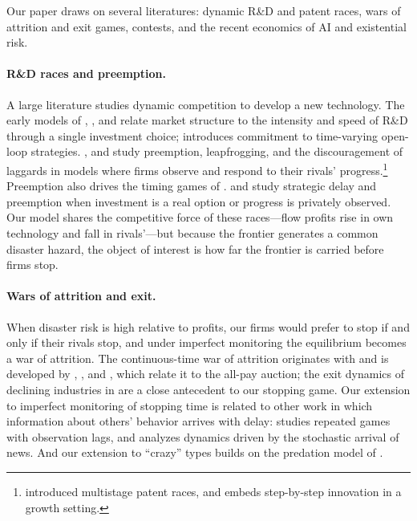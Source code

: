 \documentclass[12pt,reqno]{article}
\theoremstyle{definition} \newtheorem{example}{Example}
\theoremstyle{definition} \newtheorem{condition}{Condition}
\theoremstyle{definition} \newtheorem{corollary}{Corollary}
\theoremstyle{definition} \newtheorem{claim}{Claim}
\theoremstyle{definition} \newtheorem{definition}{Definition}
\theoremstyle{definition} \newtheorem{conjecture}{Conjecture}
\theoremstyle{definition} \newtheorem{Lemma}{Lemma}
\theoremstyle{definition} \newtheorem{lemma}{Lemma}
\theoremstyle{plain} \newtheorem{theorem}{Theorem}
\theoremstyle{definition} \newtheorem{assumption}{Assumption}
\theoremstyle{definition} \newtheorem*{assumptionnonumber}{Assumption}
\theoremstyle{definition} \newtheorem*{theoremNoNumber}{Proposition}
\theoremstyle{definition}
\theoremstyle{definition}\newtheorem{proposition}{Proposition}
\theoremstyle{definition} \newtheorem{result}{Result}
\theoremstyle{definition} \newtheorem*{definitionNoNumber}{Definition}
\theoremstyle{definition} \newtheorem{Definition}{Definition}
\theoremstyle{definition} \newtheorem*{DefinitionNoNumber}{Definition}
\theoremstyle{definition} \newtheorem*{fact}{Fact}
\theoremstyle{definition} \newtheorem*{property}{Property}
\theoremstyle{definition} \newtheorem{remark}{Remark}
\begin{document}
Our paper draws on several literatures: dynamic R\&D and patent races, wars of
attrition and exit games, contests, and the recent
economics of AI and existential risk. 

\paragraph{R\&D races and preemption.}
A large literature studies dynamic competition to develop a new technology. The early models of \citet{loury1979market}, \citet{lee1980market}, and \citet{dasgupta1980uncertainty} relate market structure to the intensity and speed of R\&D through a single investment choice;   \citet{reinganum1982dynamic} introduces commitment to  time-varying open-loop  strategies. \citet{fudenberg1983preemption}, \citet{harris1985perfect} and \citet{ harris1987racing} study preemption, leapfrogging, and the discouragement of laggards in models where firms observe and respond to their rivals' progress.\footnote{\citet{fudenberg1983preemption} introduced multistage patent races, and
\citet{aghion2001competition} embeds step-by-step innovation in a growth
setting. } Preemption
also drives the timing games of \citet{fudenberg1985preemption}. \citet{weeds2002strategic} and \citet{hopenhayn2011preemption} study
strategic delay and preemption when investment is a real option or progress is
privately observed. Our model shares the competitive force of these races---flow
profits rise in own technology and fall in rivals'---but because the frontier
generates a common disaster hazard, the object of interest is how far the frontier is carried before firms stop.

\paragraph{Wars of attrition and exit.}
When disaster risk is high relative to profits, our firms would prefer to stop
if and only if their rivals stop, and under imperfect monitoring the equilibrium
becomes a war of attrition. The continuous-time war of attrition originates with
\citet{maynardsmith1974theory} and is developed by \citet{hendricks1988war},
\citet{bulow1999generalized}, and \citet{krishna1997analysis}, which relate it
to the all-pay auction; the exit dynamics of declining industries in
\citet{fudenberg1986theory} are a close antecedent to our stopping game.
Our extension to imperfect monitoring of stopping time  is related to other work in which
information about others' behavior arrives with delay:
\citet{fudenberg2014delayed} studies repeated games with observation lags, and
\citet{daley2012waiting} analyzes dynamics driven by the stochastic arrival of
news.  And our extension to  ``crazy'' types builds on the predation model of \citet{kreps1982reputation}.
\end{document}
